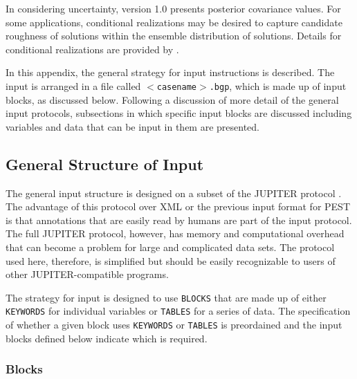 \documentclass[11pt,oneside,onecolumn]{usgsreport}
\begin{document}
\begin{multicols}{2}
\begin{bibunit}
In considering uncertainty, version 1.0 presents posterior covariance
values. For some applications, conditional realizations may be desired
to capture candidate roughness of solutions within the ensemble distribution
of solutions. Details for conditional realizations are provided by
\citet{Kitanidis1995}.

%
%


\putbib[GW]
\end{bibunit}
\end{multicols}
\begin{appendix}
\begin{bibunit}

In this appendix, the general strategy for input instructions is described.
The input is arranged in a file called \texttt{$<$casename$>$.bgp}, which
is made up of input blocks, as discussed below. Following a discussion
of more detail of the general input protocols, subsections in which
specific input blocks are discussed including variables and data that
can be input in them are presented. 


\subsection{General Structure of Input}

The general input structure is designed on a subset of the JUPITER
protocol \citep{BantaEtAl2006}. The advantage of this protocol over
XML or the previous input format for PEST is that annotations that
are easily read by humans are part of the input protocol. The full
JUPITER protocol, however, has memory and computational overhead that
can become a problem for large and complicated data sets. The protocol
used here, therefore, is simplified but should be easily recognizable
to users of other JUPITER-compatible programs.

The strategy for input is designed to use \texttt{BLOCKS} that are
made up of either \texttt{KEYWORDS} for individual variables or \texttt{TABLES}
for a series of data. The specification of whether a given block uses
\texttt{KEYWORDS} or \texttt{TABLES} is preordained and the input
blocks defined below indicate which is required.


\subsubsection{Blocks}


\end{bibunit}
\end{appendix}
\end{document}

